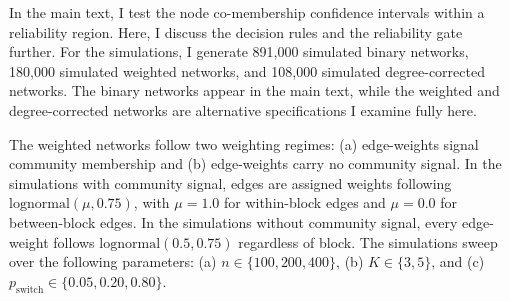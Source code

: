 \documentclass[11pt, letterpaper]{article}
\numberwithin{equation}{section}
\begin{document}
In the main text, I test the node co-membership confidence intervals within a reliability region. Here, I discuss the decision rules and the reliability gate further. For the simulations, I generate 891,000 simulated binary networks, 180,000 simulated weighted networks, and 108,000 simulated degree-corrected networks. The binary networks appear in the main text, while the weighted and degree-corrected networks are alternative specifications I examine fully here.

The weighted networks follow two weighting regimes: (a) edge-weights signal community membership and (b) edge-weights carry no community signal. In the simulations with community signal, edges are assigned weights following $\mathrm{lognormal}(\mu, 0.75)$, with $\mu = 1.0$ for within-block edges and $\mu = 0.0$ for between-block edges. In the simulations without community signal, every edge-weight follows $\mathrm{lognormal}(0.5, 0.75)$ regardless of block. The simulations sweep over the following parameters: (a) $n \in \{100, 200, 400\}$, (b) $K \in \{3, 5\}$, and (c) $p_{\mathrm{switch}} \in \{0.05, 0.20, 0.80\}$.
\end{document}
